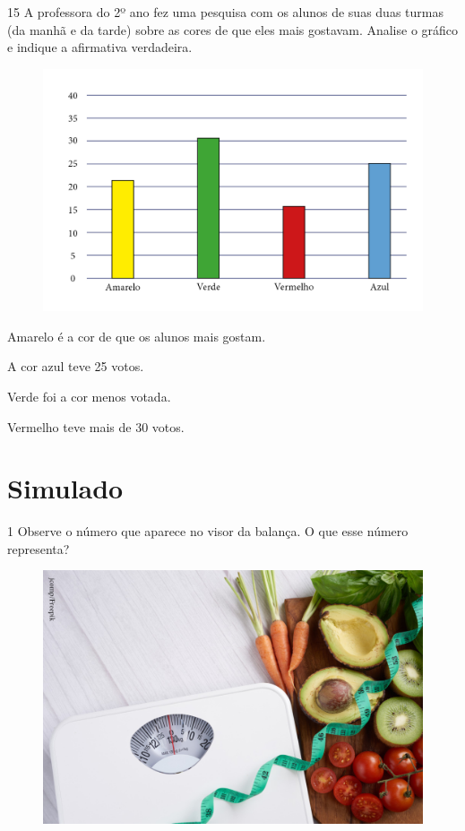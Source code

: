 \num{15} A professora do 2º ano fez uma pesquisa com os alunos de suas duas
turmas (da manhã e da tarde) sobre as cores de que eles mais gostavam.
Analise o gráfico e indique a afirmativa verdadeira.

\begin{figure}[H]
\includegraphics[width=\textwidth]{./media/image136.png}
\end{figure}

\begin{escolha}[itemsep=-5pt]
\item Amarelo é a cor de que os alunos mais gostam.

\item A cor azul teve 25 votos.

\item Verde foi a cor menos votada.

\item Vermelho teve mais de 30 votos.
\end{escolha}

\chapter[Simulado 3]{Simulado}

\num{1} Observe o número que aparece no visor da balança. O que esse número
representa?

\begin{figure}[H]
\centering
\includegraphics[width=.6\textwidth]{./media/image137.png}
\end{figure}

